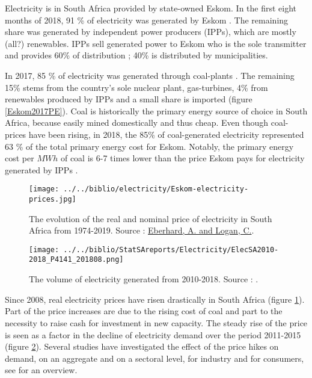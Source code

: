 \documentclass[12pt,english]{article}
\begin{document}
Electricity is in South Africa provided by state-owned Eskom. In the first eight months of 2018, 91 \% of electricity was generated by Eskom \citep{P4141_201808}. The remaining share was generated by independent power producers (IPPs), which are mostly (all?) renewables. IPPs sell generated power to Eskom who is the sole transmitter and provides 60\% of distribution ; 40\% is distributed by municipalities.

In 2017, 85 \% of electricity was generated through coal-plants \citep{Eskom2017AR}. The remaining 15\% stems from the country's sole nuclear plant, gas-turbines, 4\% from renewables produced by IPPs and a small share is imported (figure \ref{Eskom2017PE}). Coal is historically the primary energy source of choice in South Africa, because easily mined domestically and thus cheap. Even though coal-prices have been rising, in 2018, the 85\% of coal-generated electricity represented 63 \% of the total primary energy cost for Eskom. Notably, the primary energy cost per $MWh$ of coal is 6-7 times lower than the price Eskom pays for electricity generated by IPPs \citep{Eskom2017AR}.  

\begin{figure}[!t]
	\centering
	\texttt{[image: ../../biblio/electricity/Eskom-electricity-prices.jpg]}
	\caption{\label{Eskom-electricity-prices} The evolution of the real and nominal price of electricity in South Africa from 1974-2019. Source : \href{https://mybroadband.co.za/news/business/68724-how-lecturers-tore-eskoms-tariff-case-apart-in-25-minutes.html}{Eberhard, A. and Logan, C.}.}
\end{figure}


\begin{figure}[!t]
	\centering
	\texttt{[image: ../../biblio/StatSAreports/Electricity/ElecSA2010-2018\_P4141\_201808.png]}
	\caption{\label{Elecvolume_2010_2018}The volume of electricity generated from 2010-2018. Source : \citep{P4141_201808}.}
\end{figure}


Since 2008, real electricity prices have risen drastically in South Africa (figure \ref{Eskom-electricity-prices}). Part of the price increases are due to the rising cost of coal and part to the necessity to raise cash for investment in new capacity. The steady rise of the price is seen as a factor in the decline of electricity demand over the period 2011-2015 (figure \ref{Elecvolume_2010_2018}). Several studies have investigated the effect of the price hikes on demand, on an aggregate and on a sectoral level, for industry and for consumers, see \cite{goliger2018electricity} for an overview.
\end{document}
